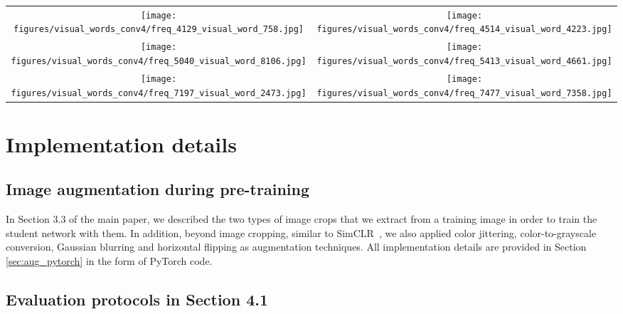 \documentclass[final]{cvpr}
\newcommand{\resnetfifty}{ResNet50\xspace}
\begin{document}
\begin{figure*}
\begin{tabular}{cc}
    \texttt{[image: figures/visual\_words\_conv4/freq\_4129\_visual\_word\_758.jpg]} & \texttt{[image: figures/visual\_words\_conv4/freq\_4514\_visual\_word\_4223.jpg]} \\
    \texttt{[image: figures/visual\_words\_conv4/freq\_5040\_visual\_word\_8106.jpg]} & \texttt{[image: figures/visual\_words\_conv4/freq\_5413\_visual\_word\_4661.jpg]} \\
    \texttt{[image: figures/visual\_words\_conv4/freq\_7197\_visual\_word\_2473.jpg]} & \texttt{[image: figures/visual\_words\_conv4/freq\_7477\_visual\_word\_7358.jpg]} \\
    \end{tabular}
    \vspace{-8pt}
    \caption{\textbf{Examples of visual-word members from the \texttt{conv4} layer of \resnetfifty.} 
    The visualizations are created by using the state of the queue-based visual-words vocabulary at the end of training. 
    For each visual word, we depict the 8 image patches retrieved from ImageNet with the highest assignment score for that word.
    }
    \label{fig:visual_words_conv4}
\end{figure*}

\section{Implementation details} \label{sec:appendix_implementation_details}

\subsection{Image augmentation during pre-training}

In Section 3.3 of the main paper, we described the two types of image crops that we extract from a training image in order to train the student network with them.
In addition, beyond image cropping, similar to SimCLR~\cite{chen2020simple}, we also applied color jittering, color-to-grayscale conversion, Gaussian blurring and horizontal flipping as augmentation techniques. 
All implementation details are provided in Section \ref{sec:aug_pytorch} in the form of PyTorch code.

\subsection{Evaluation protocols in Section 4.1}
\end{document}
